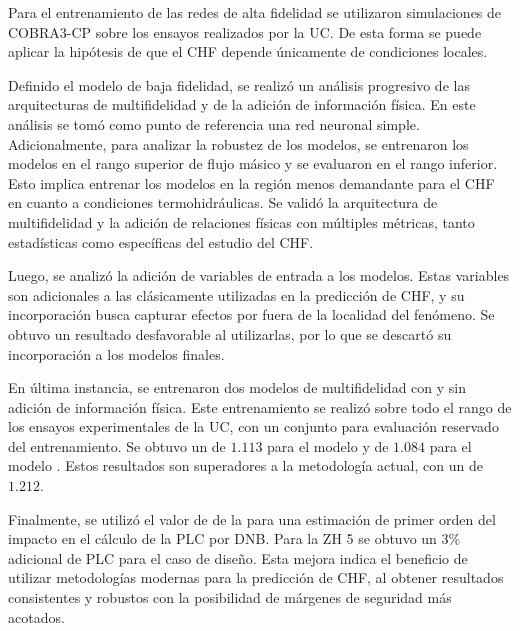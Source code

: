 Para el entrenamiento de las redes de alta fidelidad se utilizaron simulaciones de COBRA3-CP sobre los ensayos realizados por la UC. De esta forma se puede aplicar la hipótesis de que el CHF depende únicamente de condiciones locales.

Definido el modelo de baja fidelidad, se realizó un análisis progresivo de las arquitecturas de multifidelidad y de la adición de información física. En este análisis se tomó como punto de referencia una red neuronal simple. Adicionalmente, para analizar la robustez de los modelos, se entrenaron los modelos en el rango superior de flujo másico y se evaluaron en el rango inferior. Esto implica entrenar los modelos en la región menos demandante para el CHF en cuanto a condiciones termohidráulicas. Se validó la arquitectura de multifidelidad y la adición de relaciones físicas con múltiples métricas, tanto estadísticas como específicas del estudio del CHF.

Luego, se analizó la adición de variables de entrada a los modelos. Estas variables son adicionales a las clásicamente utilizadas en la predicción de CHF, y su incorporación busca capturar efectos por fuera de la localidad del fenómeno. Se obtuvo un resultado desfavorable al utilizarlas, por lo que se descartó su incorporación a los modelos finales.

En última instancia, se entrenaron dos modelos de multifidelidad con y sin adición de información física. Este entrenamiento se realizó sobre todo el rango de los ensayos experimentales de la UC, con un conjunto para evaluación reservado del entrenamiento. Se obtuvo un \dnbrmin{} de $1.113$ para el modelo \mfdnn{} y de $1.084$ para el modelo \mfpinn{}. Estos resultados son superadores a la metodología actual, con un \dnbrmin{} de $1.212$.

Finalmente, se utilizó el valor de \dnbrmin{} de la \mfpinn{} para una estimación de primer orden del impacto en el cálculo de la PLC por DNB. Para la ZH 5 se obtuvo un $3\%$ adicional de PLC para el caso de diseño. Esta mejora indica el beneficio de utilizar metodologías modernas para la predicción de CHF, al obtener resultados consistentes y robustos con la posibilidad de márgenes de seguridad más acotados.

